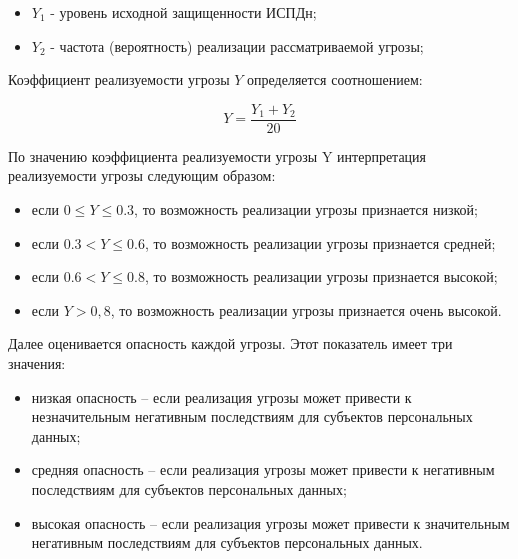 \begin{itemize}
    \item $Y_1$ - уровень исходной защищенности ИСПДн;
    \item $Y_2$ - частота (вероятность) реализации рассматриваемой угрозы;
\end{itemize}

Коэффициент реализуемости угрозы $Y$ определяется соотношением: 

\[Y = \frac{Y_1 + Y_2}{20}\]

По значению коэффициента реализуемости угрозы Y 
интерпретация реализуемости угрозы следующим образом: 
\begin{itemize}
    \item если $0 \leq Y \leq 0.3$, то возможность реализации угрозы признается низкой;
    \item если $0.3 < Y \leq  0.6$, то возможность реализации угрозы признается средней;
    \item если $0.6 < Y \leq  0.8$, то возможность реализации угрозы признается высокой;
    \item если $Y > 0,8$, то возможность реализации угрозы признается очень высокой.
\end{itemize}

Далее оценивается опасность каждой угрозы.
Этот показатель имеет три значения: 
\begin{itemize}
    \item низкая опасность – если реализация угрозы может привести к незначительным негативным последствиям для субъектов персональных данных;
    \item средняя опасность – если реализация угрозы может привести к негативным последствиям для субъектов персональных данных;
    \item высокая опасность – если реализация угрозы может привести к значительным негативным последствиям для субъектов персональных данных.
\end{itemize}

